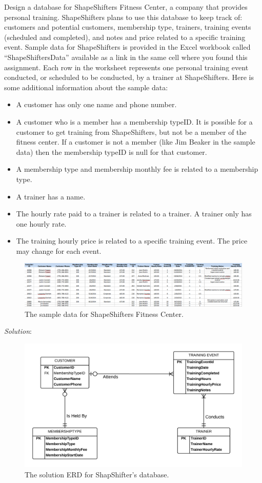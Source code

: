 \documentclass{article}
\begin{document}
Design a database for ShapeShifters Fitness Center, a company that provides personal training. ShapeShifters plans to use this database to keep track of: customers and potential customers, membership type, trainers, training events (scheduled and completed), and notes and price related to a specific training event. Sample data for ShapeShifters is provided in the Excel workbook called “ShapeShiftersData” available as a link in the same cell where you found this assignment. Each row in the worksheet represents one personal training event conducted, or scheduled to be conducted, by a trainer at ShapeShifters. Here is some additional information about the sample data:
\begin{itemize}
  \item A customer has only one name and phone number.
  \item A customer who is a member has a membership typeID. It is possible for a customer to get training from ShapeShifters, but not be a member of the fitness center. If a customer is not a member (like Jim Beaker in the sample data) then the membership typeID is null for that customer.
  \item A membership type and membership monthly fee is related to a membership type.
  \item A trainer has a name.
  \item The hourly rate paid to a trainer is related to a trainer. A trainer only has one hourly rate.
  \item The training hourly price is related to a specific training event. The price may change for each event.
\end{itemize}

  \begin{figure}[h]
    \centering
    \includegraphics[width=.9\linewidth]{shapeshifter_data}
    \caption{The sample data for ShapeShifters Fitness Center.}
    \label{fig:chemeng}
  \end{figure}

\textit{Solution}:

  \begin{figure}[h]
    \centering
    \includegraphics[width=.7\linewidth]{HW02_02-ERD}
    \caption{The solution ERD for ShapShifter's database.}
    \label{fig:shapeshifter}
  \end{figure}
\end{document}
